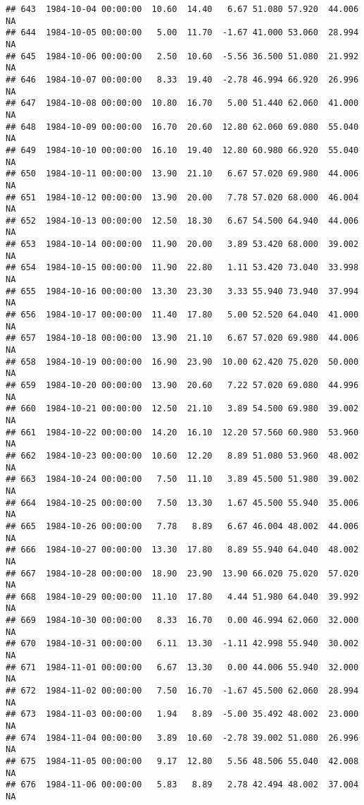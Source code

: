 \documentclass{article}\usepackage{graphicx, color}
\makeatletter
\newenvironment{kframe}{%
 \def\at@end@of@kframe{}%
 \ifinner\ifhmode%
  \def\at@end@of@kframe{\end{minipage}}%
  \begin{minipage}{\columnwidth}%
 \fi\fi%
 \def\FrameCommand##1{\hskip\@totalleftmargin \hskip-\fboxsep
 \colorbox{shadecolor}{##1}\hskip-\fboxsep
     \hskip-\linewidth \hskip-\@totalleftmargin \hskip\columnwidth}%
 \MakeFramed {\advance\hsize-\width
   \@totalleftmargin\z@ \linewidth\hsize
   \@setminipage}}%
 {\par\unskip\endMakeFramed%
 \at@end@of@kframe}
\newenvironment{knitrout}{}{} %
\makeatother
\begin{document}
\begin{knitrout}
\begin{kframe}
\begin{verbatim}
## 643  1984-10-04 00:00:00  10.60  14.40   6.67 51.080 57.920  44.006     NA
## 644  1984-10-05 00:00:00   5.00  11.70  -1.67 41.000 53.060  28.994     NA
## 645  1984-10-06 00:00:00   2.50  10.60  -5.56 36.500 51.080  21.992     NA
## 646  1984-10-07 00:00:00   8.33  19.40  -2.78 46.994 66.920  26.996     NA
## 647  1984-10-08 00:00:00  10.80  16.70   5.00 51.440 62.060  41.000     NA
## 648  1984-10-09 00:00:00  16.70  20.60  12.80 62.060 69.080  55.040     NA
## 649  1984-10-10 00:00:00  16.10  19.40  12.80 60.980 66.920  55.040     NA
## 650  1984-10-11 00:00:00  13.90  21.10   6.67 57.020 69.980  44.006     NA
## 651  1984-10-12 00:00:00  13.90  20.00   7.78 57.020 68.000  46.004     NA
## 652  1984-10-13 00:00:00  12.50  18.30   6.67 54.500 64.940  44.006     NA
## 653  1984-10-14 00:00:00  11.90  20.00   3.89 53.420 68.000  39.002     NA
## 654  1984-10-15 00:00:00  11.90  22.80   1.11 53.420 73.040  33.998     NA
## 655  1984-10-16 00:00:00  13.30  23.30   3.33 55.940 73.940  37.994     NA
## 656  1984-10-17 00:00:00  11.40  17.80   5.00 52.520 64.040  41.000     NA
## 657  1984-10-18 00:00:00  13.90  21.10   6.67 57.020 69.980  44.006     NA
## 658  1984-10-19 00:00:00  16.90  23.90  10.00 62.420 75.020  50.000     NA
## 659  1984-10-20 00:00:00  13.90  20.60   7.22 57.020 69.080  44.996     NA
## 660  1984-10-21 00:00:00  12.50  21.10   3.89 54.500 69.980  39.002     NA
## 661  1984-10-22 00:00:00  14.20  16.10  12.20 57.560 60.980  53.960     NA
## 662  1984-10-23 00:00:00  10.60  12.20   8.89 51.080 53.960  48.002     NA
## 663  1984-10-24 00:00:00   7.50  11.10   3.89 45.500 51.980  39.002     NA
## 664  1984-10-25 00:00:00   7.50  13.30   1.67 45.500 55.940  35.006     NA
## 665  1984-10-26 00:00:00   7.78   8.89   6.67 46.004 48.002  44.006     NA
## 666  1984-10-27 00:00:00  13.30  17.80   8.89 55.940 64.040  48.002     NA
## 667  1984-10-28 00:00:00  18.90  23.90  13.90 66.020 75.020  57.020     NA
## 668  1984-10-29 00:00:00  11.10  17.80   4.44 51.980 64.040  39.992     NA
## 669  1984-10-30 00:00:00   8.33  16.70   0.00 46.994 62.060  32.000     NA
## 670  1984-10-31 00:00:00   6.11  13.30  -1.11 42.998 55.940  30.002     NA
## 671  1984-11-01 00:00:00   6.67  13.30   0.00 44.006 55.940  32.000     NA
## 672  1984-11-02 00:00:00   7.50  16.70  -1.67 45.500 62.060  28.994     NA
## 673  1984-11-03 00:00:00   1.94   8.89  -5.00 35.492 48.002  23.000     NA
## 674  1984-11-04 00:00:00   3.89  10.60  -2.78 39.002 51.080  26.996     NA
## 675  1984-11-05 00:00:00   9.17  12.80   5.56 48.506 55.040  42.008     NA
## 676  1984-11-06 00:00:00   5.83   8.89   2.78 42.494 48.002  37.004     NA

\end{verbatim}
\end{kframe}
\end{knitrout}
\end{document}
